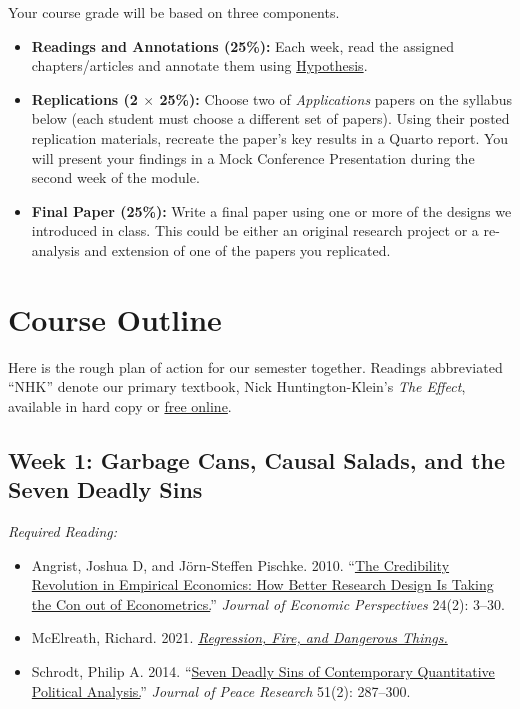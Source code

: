 \documentclass[11pt, letterpaper]{article}
\begin{document}
Your course grade will be based on three components.

\begin{itemize}
	\item \textbf{Readings and Annotations (25\%):} Each week, read the assigned chapters/articles and annotate them using \href{https://hypothes.is/groups/Qm2VnAae/causal-inference}{Hypothesis}.
	\item \textbf{Replications (2 $\times$ 25\%):} Choose two of \textit{Applications} papers on the syllabus below (each student must choose a different set of papers). Using their posted replication materials, recreate the paper's key results in a Quarto report. You will present your findings in a Mock Conference Presentation during the second week of the module.
	\item \textbf{Final Paper (25\%):} Write a final paper using one or more of the designs we introduced in class. This could be either an original research project or a re-analysis and extension of one of the papers you replicated.
\end{itemize}


\section*{Course Outline}

Here is the rough plan of action for our semester together. Readings abbreviated ``NHK'' denote our primary textbook, Nick Huntington-Klein's \textit{The Effect}, available in hard copy or \href{https://theeffectbook.net/}{free online}.

\subsection*{Week 1: Garbage Cans, Causal Salads, and the Seven Deadly Sins}

\textit{Required Reading:}

\begin{itemize}
	\item Angrist, Joshua D, and Jörn-Steffen Pischke. 2010. ``\href{https://pubs.aeaweb.org/doi/pdfplus/10.1257/jep.24.2.3}{The Credibility Revolution in Empirical Economics: How Better Research Design Is Taking the Con out of Econometrics.}'' \textit{Journal of Economic Perspectives} 24(2): 3–30.
	\item McElreath, Richard. 2021. \href{https://elevanth.org/blog/2021/06/15/regression-fire-and-dangerous-things-1-3/}{\textit{Regression, Fire, and Dangerous Things.}}
	\item Schrodt, Philip A. 2014. ``\href{https://journals.sagepub.com/doi/pdf/10.1177/0022343313499597}{Seven Deadly Sins of Contemporary Quantitative Political Analysis.}'' \textit{Journal of Peace Research} 51(2): 287–300.
\end{itemize}
\end{document}
